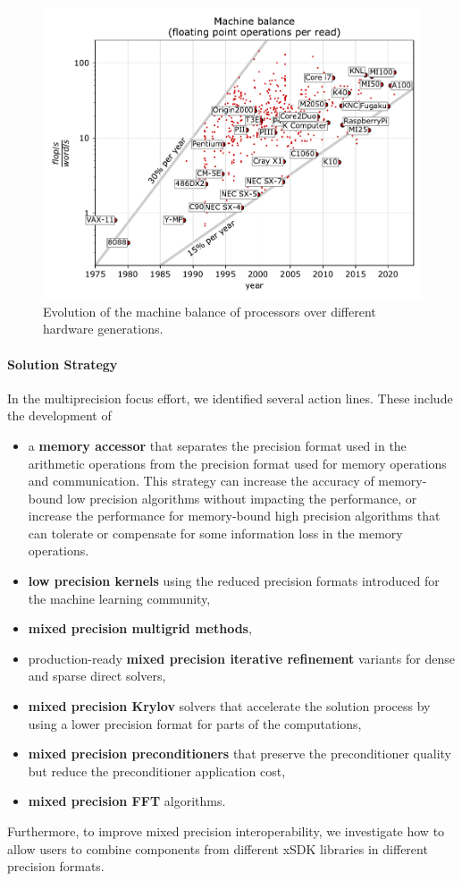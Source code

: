 \begin{figure}[htb]
	\centering
	\includegraphics[width=.8\columnwidth]{projects/2.3.3-MathLibs/2.3.3.01-xSDK/xsdk-machinebalance.pdf}
	\caption{\label{fig:xsdk-machinebalance} Evolution of the machine balance of processors over different hardware generations.}
\end{figure}


\paragraph{Solution Strategy}
In the multiprecision focus effort, we identified several action lines. These include the development of
\begin{itemize}
\item a \textbf{memory accessor} that separates the precision format used in the arithmetic operations from the precision format used for memory operations and communication. This strategy can increase the accuracy of memory-bound low precision algorithms without impacting the performance, or increase the performance for memory-bound high precision algorithms that can tolerate or compensate for some information loss in the memory operations.
\item \textbf{low precision kernels} using the reduced precision formats introduced for the machine learning community,
\item \textbf{mixed precision multigrid methods},
\item production-ready \textbf{mixed precision iterative refinement} variants for dense and sparse direct solvers,
\item \textbf{mixed precision Krylov} solvers that accelerate the solution process by using a lower precision format for parts of the computations,
\item \textbf{mixed precision preconditioners} that preserve the preconditioner quality but reduce the preconditioner application cost,
\item \textbf{mixed precision FFT} algorithms.
\end{itemize}
Furthermore, to improve mixed precision interoperability, we investigate how to allow users to combine components from different xSDK libraries in different precision formats.


